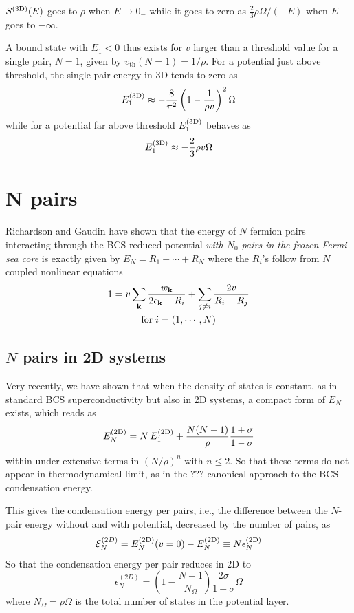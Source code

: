 \documentclass[aps,prb,showpacs,reprint]{revtex4-1}
\begin{document}
$S^{{\text{(3D)}}}(E)$ goes to $\rho$ when $E\rightarrow0_-$ while it goes to zero as $\frac{2}{3}\rho\Omega/(-E)$ when $E$ goes to $-\infty$. 

A bound state with $E_1<0$ thus exists for $v$ larger than a threshold value for a single pair, $N=1$, given by  $v_{\text{th}}(N=1)=1/\rho$.  For a potential just above threshold, the single pair energy in 3D tends to zero as 
\begin{equation}
E_1^{{\text{(3D)}}}\approx-\frac{8}{\pi^2}\left(1-\frac{1}{\rho{}v}\right)^2\Omega
\label{eq:}
\end{equation}
while for a potential far above threshold $E_1^{{\text{(3D)}}}$ behaves as 
\begin{equation}
E_1^{{\text{(3D)}}}\approx-\frac{2}{3}\rho{v}\Omega
\label{eq:}
\end{equation}


\section{N pairs\label{sec:NPair}}
Richardson \cite{Richardson1} and Gaudin \cite{gaudin} have shown that the energy of $N$ fermion pairs interacting through the BCS reduced potential \emph{with $N_0$  pairs in the frozen Fermi sea core} is exactly given by $E_N=R_1+\cdots+R_N$ where the $R_i$'s follow from $N$ coupled nonlinear equations 
\begin{multline}
 1=v\sum_{\mathbf{k}}\frac{w_{\mathbf{k}}}{2\epsilon_{\mathbf{k}}-R_i}+\sum_{j\neq{}i}\frac{2v}{R_i-R_j}\\\text{for}\;i=(1,\cdots,N)
\end{multline}
\subsection{$N$ pairs in 2D systems}
Very recently, we have shown that when the density of states is constant, as in standard BCS superconductivity but also in 2D systems, a compact form of $E_N$ exists, which reads as  
\begin{equation}
 E^{{\text{(2D)}}}_N=N\,E^{{\text{(2D)}}}_1+\frac{N(N-1)}{\rho}\frac{1+\sigma}{1-\sigma}
\end{equation}
within under-extensive terms in $(N/\rho)^n$ with $n\leq2$. So that these terms do not appear in thermodynamical limit, as in the ??? canonical approach to the BCS condensation energy. 

This gives the condensation energy per  pairs, i.e., the difference between the $N$-pair energy without and with potential, decreased by the number of pairs, as 
\begin{equation}
 \mathcal{E}^{(2D)}_N=E_N^{{{\text{(2D)}}}}(v=0)-E_N^{{\text{(2D)}}}\equiv{}N\epsilon_N^{{\text{(2D)}}}
 \end{equation}
 So that the condensation energy per pair reduces in 2D to
 \begin{equation}
\epsilon^{(2D)}_N=(1-\frac{N-1}{N_\Omega})\frac{2\sigma}{1-\sigma}\Omega\label{eq:E2D}
\end{equation}
where $N_\Omega=\rho\Omega$ is the total number of states in the potential layer. 
\end{document}
